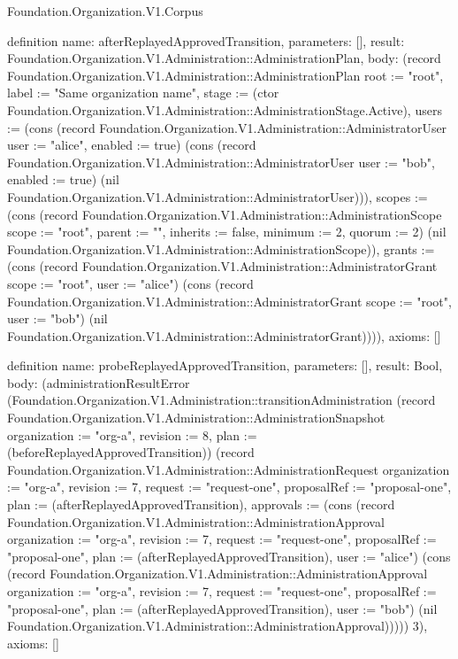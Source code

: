 \begin{lexlean}{Foundation.Organization.V1.Corpus}
\begin{semanticmodule}
definition{
  name: afterReplayedApprovedTransition,
  parameters: [],
  result: Foundation.Organization.V1.Administration::AdministrationPlan,
  body: (record Foundation.Organization.V1.Administration::AdministrationPlan {root := "root", label := "Same organization name", stage := (ctor Foundation.Organization.V1.Administration::AdministrationStage.Active), users := (cons (record Foundation.Organization.V1.Administration::AdministratorUser {user := "alice", enabled := true}) (cons (record Foundation.Organization.V1.Administration::AdministratorUser {user := "bob", enabled := true}) (nil Foundation.Organization.V1.Administration::AdministratorUser))), scopes := (cons (record Foundation.Organization.V1.Administration::AdministrationScope {scope := "root", parent := "", inherits := false, minimum := 2, quorum := 2}) (nil Foundation.Organization.V1.Administration::AdministrationScope)), grants := (cons (record Foundation.Organization.V1.Administration::AdministratorGrant {scope := "root", user := "alice"}) (cons (record Foundation.Organization.V1.Administration::AdministratorGrant {scope := "root", user := "bob"}) (nil Foundation.Organization.V1.Administration::AdministratorGrant)))}),
  axioms: []
}

definition{
  name: probeReplayedApprovedTransition,
  parameters: [],
  result: Bool,
  body: (administrationResultError (Foundation.Organization.V1.Administration::transitionAdministration (record Foundation.Organization.V1.Administration::AdministrationSnapshot {organization := "org-a", revision := 8, plan := (beforeReplayedApprovedTransition)}) (record Foundation.Organization.V1.Administration::AdministrationRequest {organization := "org-a", revision := 7, request := "request-one", proposalRef := "proposal-one", plan := (afterReplayedApprovedTransition), approvals := (cons (record Foundation.Organization.V1.Administration::AdministrationApproval {organization := "org-a", revision := 7, request := "request-one", proposalRef := "proposal-one", plan := (afterReplayedApprovedTransition), user := "alice"}) (cons (record Foundation.Organization.V1.Administration::AdministrationApproval {organization := "org-a", revision := 7, request := "request-one", proposalRef := "proposal-one", plan := (afterReplayedApprovedTransition), user := "bob"}) (nil Foundation.Organization.V1.Administration::AdministrationApproval)))})) 3),
  axioms: []
}


\end{semanticmodule}
\end{lexlean}
